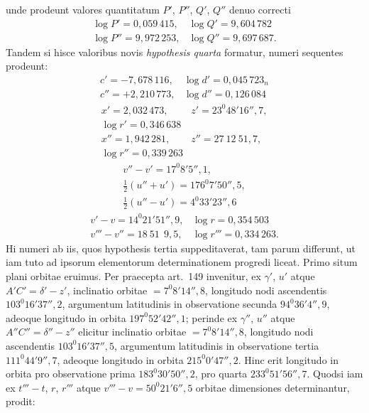 unde prodeunt valores quantitatum $P'$, $P''$, $Q'$, $Q''$ denuo correcti
\[
\begin{array}{ll}
\log P' = 0{,}059\,415, & \log Q' = 9{,}604\,782 \\
\log P'' = 9{,}972\,253, & \log Q'' = 9{,}697\,687.
\end{array}
\]
Tandem si hisce valoribus novis \emph{hypothesis quarta} formatur, numeri
sequentes prodeunt:
\[
\begin{array}{ll}
c' = -7{,}678\,116, & \log d' = 0{,}045\,723_n \\
c'' = +2{,}210\,773, & \log d'' = 0{,}126\,084
\end{array}
\]
\[
\begin{array}{ll}
x' = 2{,}032\,473, & z' = 23^{0}48'16''{,}7,\\
\log r' = 0{,}346\,638 & \\
x'' = 1{,}942\,281, & z'' = 27\ 12\ 51{,}7,\\
\log r'' = 0{,}339\,263 & 
\end{array}
\]
\[
\begin{gathered}
v''-v' = 17^{0}8'5''{,}1, \\ \tfrac{1}{2}(u''+u') = 176^{0}7'50''{,}5, \\
\tfrac{1}{2}(u''-u') = 4^{0}33'23''{,}6
\end{gathered}
\]
\[
\begin{array}{ll}
v'-v = 14^{0}21'51''{,}9, & \log r = 0{,}354\,503 \\
v'''-v'' = 18\ 51\ \ 9{,}5, & \log r''' = 0{,}334\,263.
\end{array}
\]
Hi numeri ab iis, quos hypothesis tertia suppeditaverat, tam parum
differunt, ut iam tuto ad ipsorum elementorum determinationem progredi
liceat. Primo situm plani orbitae eruimus. Per praecepta art.\ 149
invenitur, ex $\gamma'$, $u'$ atque $A'C' = \delta'-z'$, inclinatio orbitae
$= 7^{0}8'14''{,}8$, longitudo nodi ascendentis $103^{0}16'37''{,}2$, argumentum
latitudinis in observatione secunda $94^{0}36'4''{,}9$, adeoque longitudo in orbita $197^{0}52'42''{,}1$; perinde ex $\gamma''$, $u''$
atque $A''C'' = \delta''-z''$ elicitur inclinatio orbitae $= 7^{0}8'14''{,}8$,
longitudo nodi ascendentis $103^{0}16'37''{,}5$, argumentum latitudinis in
observatione tertia $111^{0}44'9''{,}7$, adeoque longitudo in orbita
$215^{0}0'47''{,}2$. Hinc erit longitudo in orbita pro observatione prima
$183^{0}30'50''{,}2$, pro quarta $233^{0}51'56''{,}7$. Quodsi iam ex $t'''-t$,
$r$, $r'''$ atque $v'''-v = 50^{0}21'6''{,}5$ orbitae dimensiones
determinantur, prodit:
